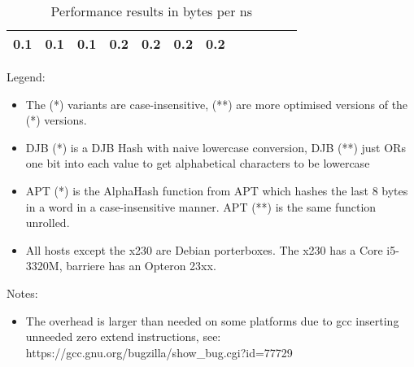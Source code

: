 \documentclass[parskip=half]{scrartcl}
\begin{document}
\begin{table}[h]
\begin{tabular}{@{}llllllllllll@{}}
\begin{minipage}[t]{0.05\columnwidth}
0.1\strut
\end{minipage} & \begin{minipage}[t]{0.05\columnwidth}\raggedright\strut
0.1\strut
\end{minipage} & \begin{minipage}[t]{0.05\columnwidth}\raggedright\strut
0.1\strut
\end{minipage} & \begin{minipage}[t]{0.05\columnwidth}\raggedright\strut
0.2\strut
\end{minipage} & \begin{minipage}[t]{0.05\columnwidth}\raggedright\strut
0.2\strut
\end{minipage} & \begin{minipage}[t]{0.05\columnwidth}\raggedright\strut
0.2\strut
\end{minipage} & \begin{minipage}[t]{0.05\columnwidth}\raggedright\strut
0.2\strut
\end{minipage}\tabularnewline
\bottomrule
\end{tabular}
\caption{Performance results in bytes per ns}

\end{table}

Legend:

\begin{itemize}
\item
  The (*) variants are case-insensitive, (**) are more optimised
  versions of the (*) versions.
\item
  DJB (*) is a DJB Hash with naive lowercase conversion, DJB (**) just
  ORs one bit into each value to get alphabetical characters to be
  lowercase
\item
  APT (*) is the AlphaHash function from APT which hashes the last 8
  bytes in a word in a case-insensitive manner. APT (**) is the same
  function unrolled.
\item
  All hosts except the x230 are Debian porterboxes. The x230 has a Core
  i5-3320M, barriere has an Opteron 23xx.
\end{itemize}
Notes:

\begin{itemize}
\item
  The overhead is larger than needed on some platforms due to gcc
  inserting unneeded zero extend instructions, see:
  https://gcc.gnu.org/bugzilla/show\_bug.cgi?id=77729
\end{itemize}

    
\end{document}
